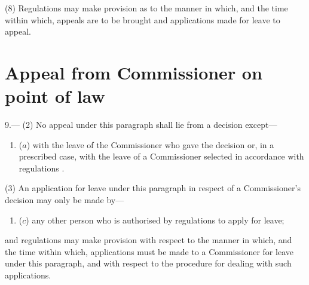 \documentclass[12pt,a4paper]{article}
\begin{document}
(8) Regulations may make provision as to the manner in which, and the time within which, appeals are to be brought and applications made for leave to appeal.


\section*{Appeal from Commissioner on point of law}

9.---%
%
(2) No appeal under this paragraph shall lie from a decision except—
\begin{enumerate}\item[]
($a$) with the leave of the Commissioner who gave the decision or, in a prescribed case, with the leave of a Commissioner selected in accordance with regulations%
%
.
\end{enumerate}

(3) An application for leave under this paragraph in respect of a Commissioner’s decision may only be made by—
\begin{enumerate}\item[]
%

($c$) any other person who is authorised by regulations to apply for leave;
\end{enumerate}
and regulations may make provision with respect to the manner in which, and the time within which, applications must be made to a Commissioner for leave under this paragraph, and with respect to the procedure for dealing with such applications.

%
%
%
\end{document}
